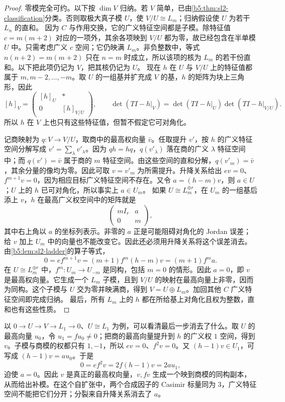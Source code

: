 \begin{proof}
	零模完全可约。以下按 \(\dim V\) 归纳。若 \(V\) 简单，已由\cref{b5:thm:sl2-classification}分类。否则取极大真子模 \(U\)，使 \(V/U\cong L_m\)；归纳假设使 \(U\) 为若干 \(L_n\) 的直和。 因为 \(C\) 与作用交换，它的广义特征空间都是子模。除特征值 \(c=m(m+2)\) 对应的一项外，其余各项映到 \(V/U\) 都为零，故已经包含在半单模 \(U\) 中。只需考虑广义 \(c\) 空间；它仍映满 \(L_m\)。非负整数中，等式 \(n(n+2)=m(m+2)\) 只在 \(n=m\) 时成立，所以该项的核为 \(L_m\) 的若干份直和。以下把此项仍记为 \(V\)，把其核仍记为 \(U\)。 现在 \(h\) 在 \(U\) 与 \(V/U\) 上的特征值都属于 \(m,m-2,\ldots,-m\)。取 \(U\) 的一组基并扩充成 \(V\) 的基，\(h\) 的矩阵为块上三角形，因此
	\[
		[h]_V=\begin{pmatrix}[h]_U&*\\0&[h]_{V/U}\end{pmatrix},
		\qquad \det(TI-h|_V)=\det(TI-h|_U)\det(TI-h|_{V/U}).
	\]
	所以 \(h\) 在 \(V\) 上也只有这些特征值，但暂不假定它可对角化。

	记商映射为 \(q:V\to V/U\)，取商中的最高权向量 \(\bar v\)。任取提升 \(v'\)，按 \(h\) 的广义特征空间分解写成 \(v'=\sum_\lambda v'_\lambda\)。因为 \(qh=hq\)，\(q(v'_\lambda)\) 落在商的广义 \(\lambda\) 特征空间中；而 \(q(v')=\bar v\) 属于商的 \(m\) 特征空间。由这些空间的直和分解，\(q(v'_m)=\bar v\)，其余分量的像均为零。因此可取 \(v=v'_m\) 为所需提升。升降关系给出 \(ev=0\)、\(f^{m+1}v=0\)，因为相应目标广义特征空间不存在。又令 \(a=(h-m)v\)，则 \(a\in U\)；\(U\) 上的 \(h\) 已可对角化，所以事实上 \(a\in U_m\)。 如果 \(U\cong L_m^{\oplus r}\)，在 \(U_m\) 的一组基后添上 \(v\)，\(h\) 在最高广义权空间中的矩阵就是
	\[
		\begin{pmatrix}mI_r&a\\0&m\end{pmatrix},
	\]
	其中右上角以 \(a\) 的坐标列表示。非零的 \(a\) 正是可能阻碍对角化的 Jordan 误差；给 \(v\) 加上 \(U_m\) 中的向量也不能改变它。因此还必须用升降关系将这个误差消去。 由\cref{b5:lem:sl2-ladder}的算子等式，
	\[
		0=ef^{m+1}v=(m+1)f^m(h-m)v=(m+1)f^m a.
	\]
	在 \(U\cong L_m^{\oplus r}\) 中，\(f^m:U_m\to U_{-m}\) 是同构，包括 \(m=0\) 的情形。因此 \(a=0\)，即 \(v\) 是最高权向量。它生成一个 \(L_m\) 子模，且到 \(V/U\) 的映射在最高向量上非零，因而为同构。这个子模与 \(U\) 交为零并映满商，得到 \(V=U\oplus L_m\)。加回其他 \(C\) 广义特征空间即完成归纳。 最后，所有 \(L_m\) 上的 \(h\) 都在所给基上对角化且权为整数，直和也有这些性质。
\end{proof}
以 \(0\to U\to V\to L_1\to0\)、\(U\cong L_1\) 为例，可以看清最后一步消去了什么。取 \(U\) 的最高向量 \(u_0\)，令 \(u_1=fu_0\ne0\)；把商的最高向量提升到 \(h\) 的广义权 \(1\) 空间，得到 \(v\)。子模与商模的权都只有 \(1,-1\)，所以 \(ev=0\)、\(f^2v=0\)。又 \((h-1)v\in U_1\)，可写成 \((h-1)v=a u_0\)。于是
\[
	0=ef^2v=2f(h-1)v=2a u_1,
\]
迫使 \(a=0\)。因此 \(v\) 是真正的最高权向量，\(v,fv\) 生成一个映到商模的同构副本，从而给出补模。在这个自扩张中，两个合成因子的 Casimir 标量同为 \(3\)，广义特征空间不能把它们分开；分裂来自升降关系消去了 \(a\)。


